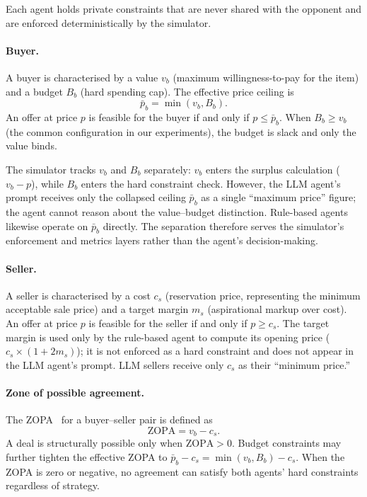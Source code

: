 Each agent holds private constraints that are never shared with the opponent and are enforced deterministically by the simulator.

\paragraph{Buyer.}  A buyer is characterised by a value $v_b$ (maximum willingness-to-pay for the item) and a budget $B_b$ (hard spending cap).  The effective price ceiling is
\[
    \bar{p}_b = \min(v_b, B_b).
\]
An offer at price $p$ is feasible for the buyer if and only if $p \leq \bar{p}_b$.  When $B_b \geq v_b$ (the common configuration in our experiments), the budget is slack and only the value binds.

The simulator tracks $v_b$ and $B_b$ separately: $v_b$ enters the surplus calculation ($v_b - p$), while $B_b$ enters the hard constraint check.  However, the LLM agent's prompt receives only the collapsed ceiling $\bar{p}_b$ as a single ``maximum price'' figure; the agent cannot reason about the value--budget distinction.  Rule-based agents likewise operate on $\bar{p}_b$ directly.  The separation therefore serves the simulator's enforcement and metrics layers rather than the agent's decision-making.

\paragraph{Seller.}  A seller is characterised by a cost $c_s$ (reservation price, representing the minimum acceptable sale price) and a target margin $m_s$ (aspirational markup over cost).  An offer at price $p$ is feasible for the seller if and only if $p \geq c_s$.  The target margin is used only by the rule-based agent to compute its opening price ($c_s \times (1 + 2m_s)$); it is not enforced as a hard constraint and does not appear in the LLM agent's prompt.  LLM sellers receive only $c_s$ as their ``minimum price.''

\paragraph{Zone of possible agreement.}
The ZOPA~\cite{raiffa1982} for a buyer--seller pair is defined as
\[
    \text{ZOPA} = v_b - c_s.
\]
A deal is structurally possible only when $\text{ZOPA} > 0$.  Budget constraints may further tighten the effective ZOPA to $\bar{p}_b - c_s = \min(v_b, B_b) - c_s$.  When the ZOPA is zero or negative, no agreement can satisfy both agents' hard constraints regardless of strategy.

